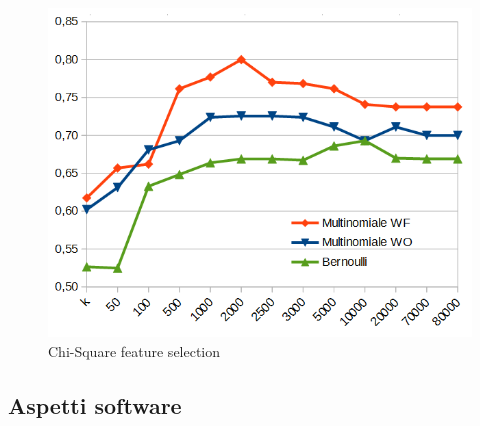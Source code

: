 \documentclass{article}
\theoremstyle{plain}
\theoremstyle{definition}
\begin{document}
\begin{figure}[htbp]
\begin{center}
\includegraphics[scale=0.55]{img/gr3.png}
\caption{Chi-Square feature selection}
\end{center}
\end{figure}
\newpage
\subsection{Aspetti software}
\end{document}
